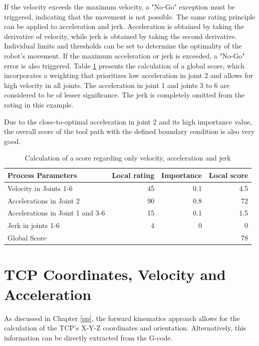 If the velocity exceeds the maximum velocity, a "No-Go" exception must be triggered, indicating that the movement is not possible. The same rating principle can be applied to acceleration and jerk. Acceleration is obtained by taking the derivative of velocity, while jerk is obtained by taking the second derivative. Individual limits and thresholds can be set to determine the optimality of the robot's movement. If the maximum acceleration or jerk is exceeded, a "No-Go" error is also triggered.
\newpage
Table \ref{VAJ} presents the calculation of a global score, which incorporates a weighting that prioritizes low acceleration in joint 2 and allows for high velocity in all joints. The acceleration in joint 1 and joints 3 to 6 are considered to be of lesser significance. The jerk is completely omitted from the rating in this example.

Due to the close-to-optimal acceleration in joint 2 and its high importance value, the overall score of the tool path with the defined boundary condition is also very good.

\begin{table}[H]
	\centering
	\begin{tabular}{||l|r|r|r||}
		Process Parameters & Local rating & Importance & Local score\\
		\hline
		\hline
		\hline
		Velocity in Joints 1-6& 45& 0.1&4.5\\
		Accelerations in Joint 2& 90 & 0.8 & 72\\
		Accelerations in Joint 1 and 3-6 & 15& 0.1&1.5\\
		Jerk in joints 1-6& 4& 0&0\\
		
		\hline
		\hline
		\hline
		Global Score& & &78\\
		\hline
		\hline
	\end{tabular}
	
	\caption{Calculation of a score regarding only velocity, acceleration and jerk}
	\label{VAJ}
\end{table}


\section{TCP Coordinates, Velocity and Acceleration}\label{CVA}
As discussed in Chapter \ref{pp}, the forward kinematics approach allows for the calculation of the TCP's X-Y-Z coordinates and orientation. Alternatively, this information can be directly extracted from the G-code.

